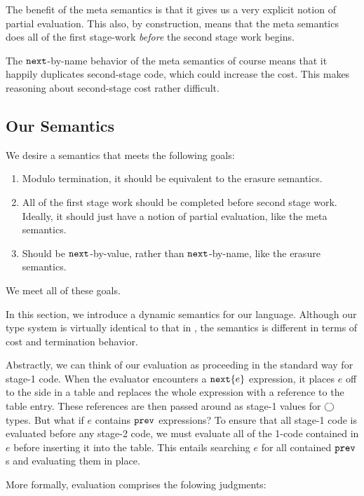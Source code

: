 The benefit of the meta semantics is that it gives us a very explicit notion of partial evaluation.  This also, by construction, means that the meta semantics does all of the first stage-work {\em before} the second stage work begins. 

The ${\tt next}$-by-name behavior of the meta semantics of course means that it happily duplicates second-stage code, which could increase the cost.  This makes reasoning about second-stage cost rather difficult.

\subsection{Our Semantics}

We desire a semantics that meets the following goals:

\begin{enumerate}
\item Modulo termination, it should be equivalent to the erasure semantics.
\item All of the first stage work should be completed before second stage work.  Ideally, it should just have a notion of partial evaluation, like the meta semantics.
\item Should be ${\tt next}$-by-value, rather than ${\tt next}$-by-name, like the erasure semantics.  
\end{enumerate}

We meet all of these goals.

In this section, we introduce a dynamic semantics for our language.  Although our type system is virtually identical to that in \cite{davies96}, the semantics is different in terms of cost and termination behavior. 

Abstractly, we can think of our evaluation as proceeding in the standard way for stage-1 code. When the evaluator encounters a ${\tt next} \{e\}$ expression, it places $e$ off to the side in a table and replaces the whole expression with a reference to the table entry.  These references are then passed around as stage-1 values for $\bigcirc$ types.  But what if $e$ contains ${\tt prev}$ expressions?  To ensure that all stage-1 code is evaluated before any stage-2 code, we must evaluate all of the 1-code contained in $e$ before inserting it into the table.  This entails searching $e$ for all contained ${\tt prev}$s and evaluating them in place.  

More formally, evaluation comprises the folowing judgments:

